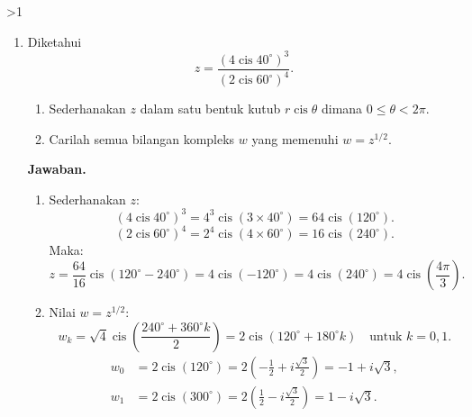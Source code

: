 \documentclass[12pt]{article}
\newcommand{\answername}{Jawaban}
\newenvironment{soaljawab}[1]{%
    \ifnum#1>1\clearpage\fi
    \begin{tcolorbox}[enhanced,breakable,height fill,height fixed for=all,
        sharp corners,colback=white,colframe=black,boxrule=0.4bp,
        boxsep=0pt,left=12bp,right=12bp,top=6bp,bottom=10bp,
        before skip=0pt,after skip=0pt,pad at break=8bp]
    \fontsize{12bp}{14bp}\selectfont
    \setlength{\abovedisplayskip}{8bp}
    \setlength{\belowdisplayskip}{8bp}
    \setlength{\abovedisplayshortskip}{8bp}
    \setlength{\belowdisplayshortskip}{8bp}
    \renewcommand{\arraystretch}{1.15}
    \begin{enumerate}[start=#1,topsep=0pt]
}{%
    \end{enumerate}
    \end{tcolorbox}
}
\newcommand{\jawaban}{\par\medskip\textbf{\answername.}\par\smallskip}
\begin{document}
\begin{soaljawab}{4}
\item Diketahui
        \[
          z = \frac{(4 \operatorname{cis} 40^\circ)^3}{(2 \operatorname{cis} 60^\circ)^4}.
        \]
        \begin{enumerate}
          \item Sederhanakan $z$ dalam satu bentuk kutub $r\operatorname{cis}\theta$ dimana $0 \le \theta < 2\pi$.
          \item Carilah semua bilangan kompleks $w$ yang memenuhi $w = z^{1/2}$.
        \end{enumerate}
\jawaban
\begin{enumerate}
          \item Sederhanakan $z$:
                \[
                  (4 \operatorname{cis} 40^\circ)^3 = 4^3 \operatorname{cis}(3 \times 40^\circ) = 64 \operatorname{cis}(120^\circ).
                \]
                \[
                  (2 \operatorname{cis} 60^\circ)^4 = 2^4 \operatorname{cis}(4 \times 60^\circ) = 16 \operatorname{cis}(240^\circ).
                \]
                Maka:
                \[
                  z = \frac{64}{16} \operatorname{cis}(120^\circ - 240^\circ) = 4 \operatorname{cis}(-120^\circ) = 4 \operatorname{cis}(240^\circ) = 4 \operatorname{cis}\left(\frac{4\pi}{3}\right).
                \]
          \item Nilai $w = z^{1/2}$:
                \[
                  w_k = \sqrt{4} \operatorname{cis}\left(\frac{240^\circ + 360^\circ k}{2}\right) = 2 \operatorname{cis}(120^\circ + 180^\circ k) \quad \text{untuk } k = 0, 1.
                \]
                \begin{align*}
                  w_0 & = 2 \operatorname{cis}(120^\circ) = 2\left(-\frac{1}{2} + i\frac{\sqrt{3}}{2}\right) = -1 + i\sqrt{3}, \\
                  w_1 & = 2 \operatorname{cis}(300^\circ) = 2\left(\frac{1}{2} - i\frac{\sqrt{3}}{2}\right) = 1 - i\sqrt{3}.
                \end{align*}
        \end{enumerate}
\end{soaljawab}
\end{document}
